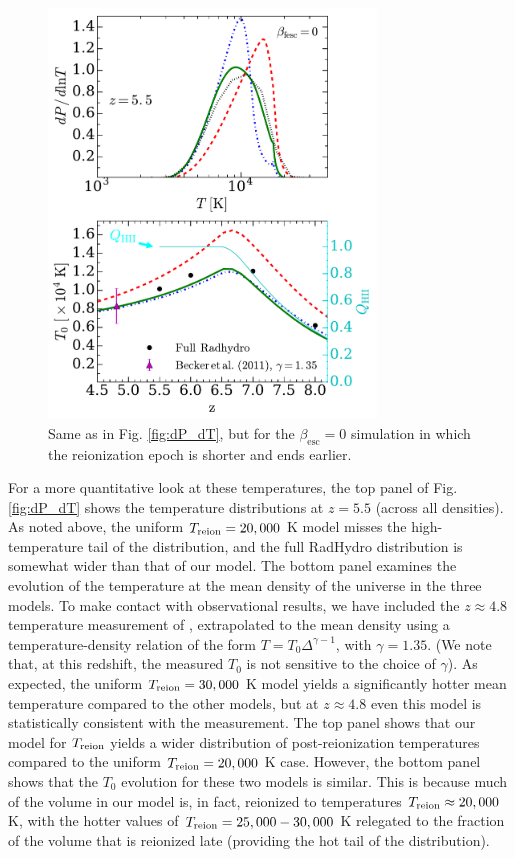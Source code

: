 \documentclass[twocolumn]{aastex62}
\newcommand{\Treion}{T_{\rm reion}}
\begin{document}
\begin{figure}
\includegraphics[width=8.7cm]{fig11.pdf}
\caption{Same as in Fig. \ref{fig:dP_dT}, but for the $\beta_{\mathrm{esc}}=0$ simulation in which the reionization epoch is shorter and ends earlier. }
\label{fig:dP_dT_B0}
\end{figure}

For a more quantitative look at these temperatures, the top panel of Fig. \ref{fig:dP_dT} shows the temperature distributions at $z=5.5$ (across all densities). As noted above, the uniform $\Treion=20,000$ K model misses the high-temperature tail of the distribution, and the full RadHydro distribution is somewhat wider than that of our model. The bottom panel examines the evolution of the temperature at the mean density of the universe in the three models.  To make contact with observational results, we have included the $z\approx 4.8$ temperature measurement of \citet{2011MNRAS.410.1096B}, extrapolated to the mean density using a temperature-density relation of the form $T=T_0 \Delta^{\gamma-1}$, with $\gamma =1.35$. (We note that, at this redshift, the measured $T_0$ is not sensitive to the choice of $\gamma$).  As expected, the uniform $\Treion =30,000$ K model yields a significantly hotter mean temperature compared to the other models, but at $z\approx 4.8$ even this model is statistically consistent with the measurement.   The top panel shows that our model for $\Treion$ yields a wider distribution of post-reionization temperatures compared to the uniform $\Treion=20,000$ K case.  However, the bottom panel shows that the $T_0$ evolution for these two models is similar.  This is because much of the volume in our model is, in fact, reionized to temperatures $\Treion \approx 20,000$ K, with the hotter values of $\Treion=25,000 - 30,000$ K relegated to the fraction of the volume that is reionized late (providing the hot tail of the distribution).  
\end{document}
